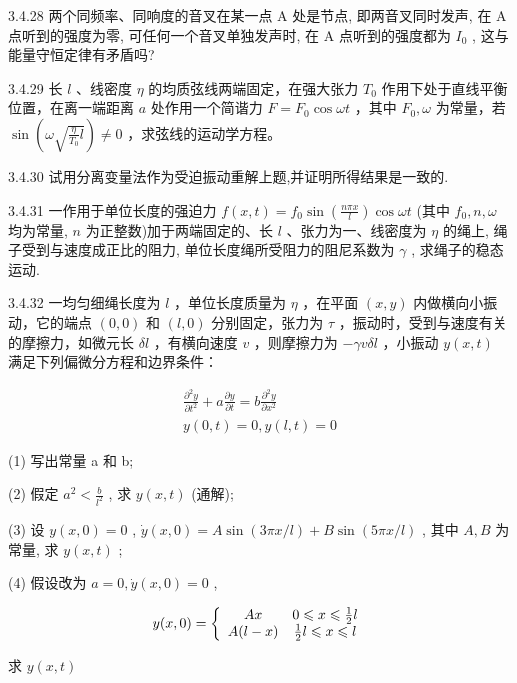 \begin{problem}{3.4.28}
两个同频率、同响度的音叉在某一点 A 处是节点, 即两音叉同时发声, 在 A 点听到的强度为零, 可任何一个音叉单独发声时, 在 A 点听到的强度都为 $I_{0}$ , 这与能量守恒定律有矛盾吗?
\end{problem}
\clearpage


\begin{problem}{3.4.29}
长 $l$ 、线密度 $\eta$ 的均质弦线两端固定，在强大张力 $T_0$ 作用下处于直线平衡位置，在离一端距离 $a$ 处作用一个简谐力 $F = F_0\cos \omega t$ ，其中 $F_0, \omega$ 为常量，若 $\sin \left(\omega \sqrt{\frac{\eta}{T_0} l}\right) \neq 0$ ，求弦线的运动学方程。
\end{problem}
\clearpage


\begin{problem}{3.4.30}
试用分离变量法作为受迫振动重解上题,并证明所得结果是一致的.
\end{problem}
\clearpage


\begin{problem}{3.4.31}
一作用于单位长度的强迫力 $f(x,t) = f_0\sin \left(\frac{n\pi x}{l}\right)\cos \omega t$ (其中 $f_0, n, \omega$ 均为常量, $n$ 为正整数)加于两端固定的、长 $l$ 、张力为一、线密度为 $\eta$ 的绳上, 绳子受到与速度成正比的阻力, 单位长度绳所受阻力的阻尼系数为 $\gamma$ , 求绳子的稳态运动.
\end{problem}
\clearpage


\begin{problem}{3.4.32}
一均匀细绳长度为 $l$ ，单位长度质量为 $\eta$ ，在平面 $(x, y)$ 内做横向小振动，它的端点 $(0, 0)$ 和 $(l, 0)$ 分别固定，张力为 $\tau$ ，振动时，受到与速度有关的摩擦力，如微元长 $\delta l$ ，有横向速度 $v$ ，则摩擦力为 $-\gamma v \delta l$ ，小振动 $y(x, t)$ 满足下列偏微分方程和边界条件：

\[
\begin{array}{c} \frac {\partial^ {2} y}{\partial t ^ {2}} + a \frac {\partial y}{\partial t} = b \frac {\partial^ {2} y}{\partial x ^ {2}} \\ y (0, t) = 0, y (l, t) = 0 \end{array}
\]

(1) 写出常量 a 和 b;

(2) 假定 $a^2 < \frac{b}{l^2}$ , 求 $y(x, t)$ (通解);

(3) 设 $y(x,0) = 0$ , $\dot{y}(x,0) = A\sin (3\pi x / l) + B\sin (5\pi x / l)$ , 其中 $A, B$ 为常量, 求 $y(x,t)$ ;

(4) 假设改为 $a=0,\dot{y}(x,0)=0$ ,

\[
y (x, 0) = \left\{ \begin{array}{c c} A x & 0 \leqslant x \leqslant \frac {1}{2} l \\ A (l - x) & \frac {1}{2} l \leqslant x \leqslant l \end{array} \right.
\]

求 $y(x,t)$
\end{problem}
\clearpage


